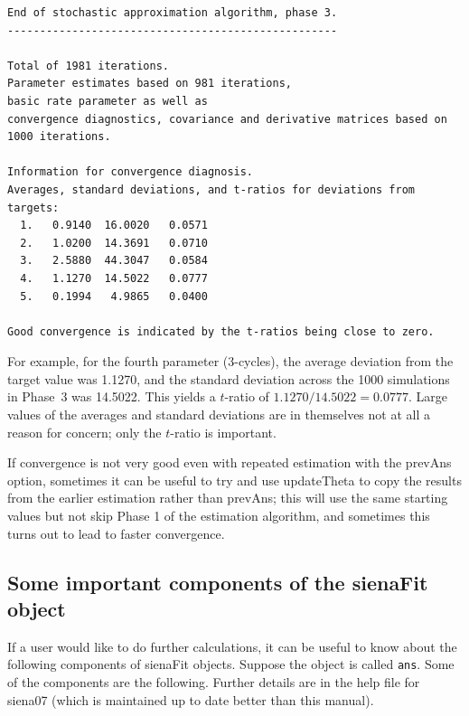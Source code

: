 \documentclass[a4paper,fleqn,11pt]{article}
\newcommand{\+}{\, + \,}
\newcommand{\sfn}[1]{\textsf{#1}}
\begin{document}
{\footnotesize
\begin{verbatim}
End of stochastic approximation algorithm, phase 3.
---------------------------------------------------

Total of 1981 iterations.
Parameter estimates based on 981 iterations,
basic rate parameter as well as
convergence diagnostics, covariance and derivative matrices based on 1000 iterations.

Information for convergence diagnosis.
Averages, standard deviations, and t-ratios for deviations from targets:
  1.   0.9140  16.0020   0.0571
  2.   1.0200  14.3691   0.0710
  3.   2.5880  44.3047   0.0584
  4.   1.1270  14.5022   0.0777
  5.   0.1994   4.9865   0.0400

Good convergence is indicated by the t-ratios being close to zero.
\end{verbatim}
}
For example, for the fourth parameter (3-cycles), the average deviation
from the target value was 1.1270, and the standard deviation across the
1000 simulations in Phase~3 was  14.5022. This yields a $t$-ratio
of $1.1270/14.5022 = 0.0777$.
Large values of the averages and standard deviations are
in themselves not at all a reason for concern; only the
$t$-ratio is important.
\medskip

If convergence is not very good even with repeated estimation with
the \sfn{prevAns} option, sometimes it can be useful to try and use
\sfn{updateTheta} to copy the results from the earlier estimation
rather than \sfn{prevAns}; this will use the same starting values
but not skip Phase 1 of the estimation algorithm, and sometimes
this turns out to lead to faster convergence.

\subsection{Some important components of the \textsf{sienaFit} object}
\label{S_fitcomp}

If a user would like to do further calculations, it can be
useful to know about the following components of  \textsf{sienaFit} objects.
Suppose the object is called \texttt{ans}. Some of the components
are the following.
Further details are in the help file for \textsf{siena07}
(which is maintained up to date better than this manual).
\end{document}
